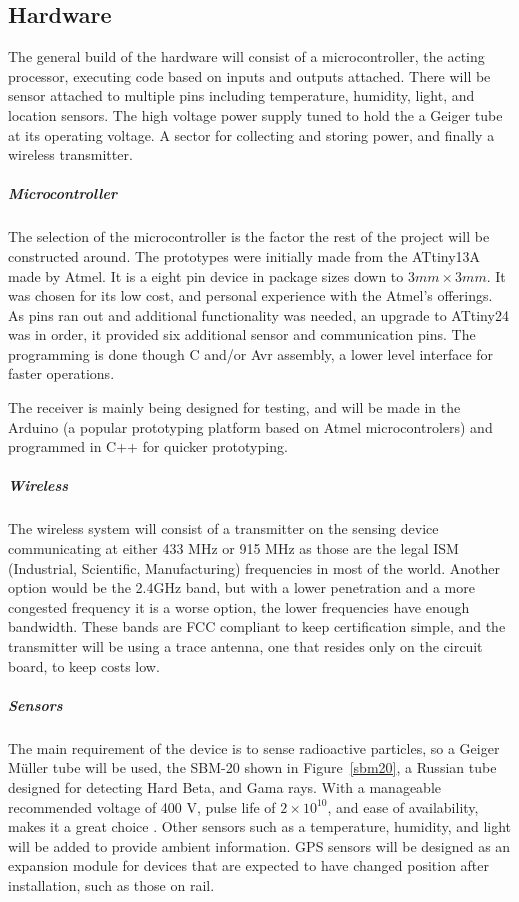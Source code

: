\documentclass[10pt]{article}
\begin{document}
\subsection{Hardware}
The general build of the hardware will consist of a microcontroller, the acting 
processor, executing code based on inputs and outputs attached. There will be 
sensor attached to multiple pins including temperature, humidity, light, and 
location sensors. The high voltage power supply tuned to hold the a Geiger 
tube at its operating voltage. A sector for collecting and storing power, and 
finally a wireless transmitter. 

\subparagraph{Microcontroller}
The selection of the microcontroller is the factor the rest of the project
will be constructed around. The prototypes were initially made from the ATtiny13A
made by Atmel. It is a eight pin device in package sizes down to $3mm \times3 mm$. 
It was chosen for its low cost, and personal experience with the Atmel's offerings.
As pins ran out and additional functionality was needed, an upgrade to ATtiny24 was
in order, it provided six additional sensor and communication pins. The programming is
done though C and/or Avr assembly, a lower level interface for faster operations.

The receiver is mainly being designed for testing, and will be made in the Arduino 
(a popular prototyping platform based on Atmel microcontrolers) and programmed in C++ 
for quicker prototyping.

\subparagraph{Wireless}
The wireless system will consist of a transmitter on the sensing device communicating at
either 433 MHz or 915 MHz as those are the legal ISM (Industrial, Scientific, Manufacturing) 
frequencies in most of the world. Another option would be the 2.4GHz band, but with a lower 
penetration and a more congested frequency it is a worse option, the lower frequencies have 
enough bandwidth. These bands are FCC compliant to keep certification simple, and the 
transmitter will be using a trace antenna, one that resides only on the circuit board, to 
keep costs low.

\subparagraph{Sensors}
The main requirement of the device is to sense radioactive particles, so a 
Geiger M\"{u}ller tube will be used, the SBM-20 shown in Figure~\ref{sbm20}, a 
Russian tube designed for detecting Hard Beta, and Gama rays. With a manageable 
recommended voltage of 400 V, pulse life of $2 \times 10^{10}$, and ease of 
availability, makes it a great choice \cite{Bodunova-Skvortsova}. Other sensors 
such as a temperature, humidity, and light will be added to provide ambient 
information. GPS sensors will be designed as an expansion module for devices 
that are expected to have changed position after installation, such as those 
on rail.
\end{document}
